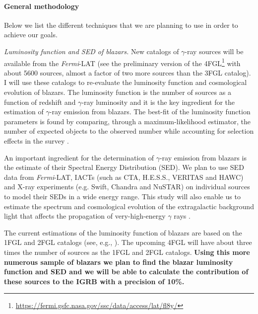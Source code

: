 \documentclass[12 pt]{article}
\newcommand{\FIXME}[1]{{\color{red}{\em Comment: }{#1}}}
\begin{document}
\vspace{-0.5cm}
\paragraph{General methodology} 
\label{sec:methodology}
Below we list the different techniques that we are planning to use in order to achieve our goals.  

{\it Luminosity function and SED of blazars.}
New catalogs of $\gamma$-ray sources will be available from the {\it Fermi}-LAT (see the preliminary version of the 4FGL\footnote{\url{https://fermi.gsfc.nasa.gov/ssc/data/access/lat/fl8y/}} with about 5600 sources, almost a factor of two more sources than the 3FGL catalog).
I will use these catalogs to re-evaluate the luminosity function and cosmological evolution of blazars.
The luminosity function is the number of sources as a function of redshift and $\gamma$-ray luminosity and it is the key ingredient for the estimation of $\gamma$-ray emission from blazars.
The best-fit of the luminosity function parameters is found by comparing, through a maximum-likelihood estimator, the number of expected objects to the observed number while accounting for selection effects in the survey \cite{2012ApJ...751..108A}. 

An important ingredient for the determination of $\gamma$-ray emission from blazars is the estimate of their Spectral Energy Distribution (SED).
We plan to use SED data from {\it Fermi}-LAT, IACTs (such as CTA, H.E.S.S., VERITAS and HAWC) and X-ray experiments (e.g. Swift, Chandra and NuSTAR) on individual sources to model their SEDs in a wide energy range.
This study will also enable us to estimate the spectrum and cosmological evolution of the extragalactic background light that affects the propagation of very-high-energy $\gamma$ rays \cite{2012Sci...338.1190A}.

The current estimations of the luminosity function of blazars are based on the 1FGL and 2FGL catalogs (see, e.g., \cite{2012ApJ...751..108A,Ajello:2015mfa,DiMauro:2013zfa}).
The upcoming 4FGL will have about three times the number of sources as the 1FGL and 2FGL catalogs.
{\bf Using this more numerous sample of blazars we plan to find the blazar luminosity function and SED and we will be able to calculate the contribution of these sources to the IGRB with a precision of 10\%.}
\end{document}
